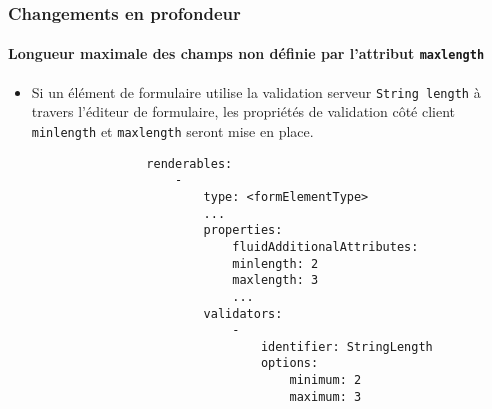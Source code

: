 
\begin{frame}[fragile]
	\frametitle{Changements en profondeur}
	\framesubtitle{Longueur maximale des champs non définie par l'attribut \texttt{maxlength}}

	\lstset{basicstyle=\tiny\ttfamily}

	\begin{itemize}
		\item Si un élément de formulaire utilise la validation serveur \texttt{String length} à travers
			l'éditeur de formulaire, les propriétés de validation côté client \texttt{minlength} et
			\texttt{maxlength} seront mise en place.

			\begin{lstlisting}
				renderables:
				    -
				        type: <formElementType>
				        ...
				        properties:
				            fluidAdditionalAttributes:
				            minlength: 2
				            maxlength: 3
				            ...
				        validators:
				            -
				                identifier: StringLength
				                options:
				                    minimum: 2
				                    maximum: 3
			\end{lstlisting}
	\end{itemize}

\end{frame}


